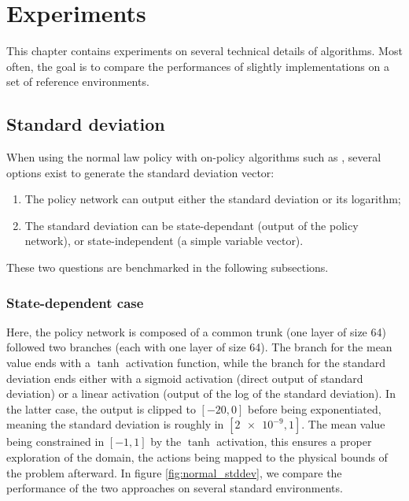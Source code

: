 \chapter{Experiments}

This chapter contains experiments on several technical details of algorithms. Most often, the goal is to compare the performances of slightly implementations on a set of reference environments.

\section{Standard deviation}

When using the normal law policy with on-policy algorithms such as \ppo, several options exist to generate the standard deviation vector:

\begin{enumerate}
	\item The policy network can output either the standard deviation or its logarithm;
	\item The standard deviation can be state-dependant (output of the policy network), or state-independent (a simple variable vector).
\end{enumerate}

These two questions are benchmarked in the following subsections.

\subsection{State-dependent case}

Here, the policy network is composed of a common trunk (one layer of size 64) followed two branches (each with one layer of size 64). The branch for the mean value ends with a $\tanh$ activation function, while the branch for the standard deviation ends either with a sigmoid activation (direct output of standard deviation) or a linear activation (output of the log of the standard deviation). In the latter case, the output is clipped to $[-20,0]$ before being exponentiated, meaning the standard deviation is roughly in $[\num{2e-9},1]$. The mean value being constrained in $[-1,1]$ by the $\tanh$ activation, this ensures a proper exploration of the domain, the actions being mapped to the physical bounds of the problem afterward. In figure \ref{fig:normal_stddev}, we compare the performance of the two approaches on several standard \gym environments.

